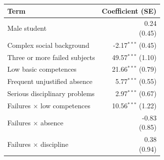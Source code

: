 \begin{tabular}{lr}
\toprule
Term & Coefficient (SE) \\
\midrule
Male student & \shortstack{0.24\\{\scriptsize (0.45)}} \\
Complex social background & \shortstack{-2.17$^{***}$\\{\scriptsize (0.45)}} \\
Three or more failed subjects & \shortstack{49.57$^{***}$\\{\scriptsize (1.10)}} \\
Low basic competences & \shortstack{21.66$^{***}$\\{\scriptsize (0.79)}} \\
Frequent unjustified absence & \shortstack{5.77$^{***}$\\{\scriptsize (0.55)}} \\
Serious disciplinary problems & \shortstack{2.97$^{***}$\\{\scriptsize (0.67)}} \\
Failures $\times$ low competences & \shortstack{10.56$^{***}$\\{\scriptsize (1.22)}} \\
Failures $\times$ absence & \shortstack{-0.83\\{\scriptsize (0.85)}} \\
Failures $\times$ discipline & \shortstack{0.38\\{\scriptsize (0.94)}} \\
\bottomrule
\end{tabular}
